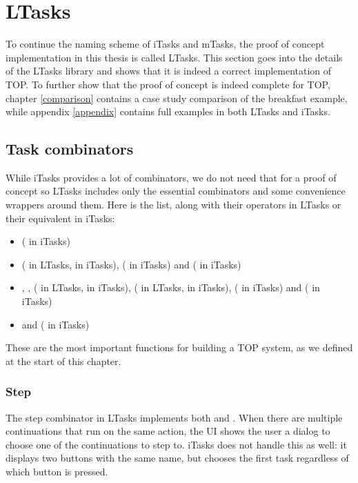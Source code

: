 \section{LTasks}\label{section-ltasks}
To continue the naming scheme of iTasks and mTasks, the proof of concept implementation in this thesis is called LTasks. This section goes into the details of the LTasks library and shows that it is indeed a correct implementation of TOP. To further show that the proof of concept is indeed complete for TOP, chapter \ref{comparison} contains a case study comparison of the breakfast example, while appendix \ref{appendix} contains full examples in both LTasks and iTasks.

\subsection{Task combinators}
While iTasks provides a lot of combinators, we do not need that for a proof of concept so LTasks includes only the essential combinators and some convenience wrappers around them. Here is the list, along with their operators in LTasks or their equivalent in iTasks:
\begin{itemize}
    \item {} ( in iTasks)
    \item {} (\lua{~} in LTasks, \clean{>>*} in iTasks),  (\clean{>>-} in iTasks) and \linebreak {} ( in iTasks)
    \item {}, ,  (\lua{&} in LTasks, \clean{-&&-} in iTasks),  (\lua{|} in LTasks, \clean{-||-} in iTasks),  (\clean{-||} in iTasks) and  (\clean{||-} in iTasks)
    \item {} and  ( in iTasks)
\end{itemize}

These are the most important functions for building a TOP system, as we defined at the start of this chapter.

\subsubsection{Step}
The step combinator in LTasks implements both  and . When there are multiple continuations that run on the same action, the UI shows the user a dialog to choose one of the continuations to step to. iTasks does not handle this as well: it displays two buttons with the same name, but chooses the first task regardless of which button is pressed.

